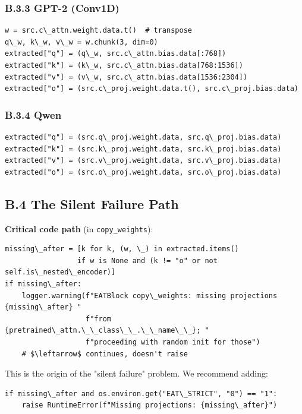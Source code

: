 \subsubsection{B.3.3 GPT-2 (Conv1D)}

\begin{lstlisting}
w = src.c\_attn.weight.data.t()  # transpose
q\_w, k\_w, v\_w = w.chunk(3, dim=0)
extracted["q"] = (q\_w, src.c\_attn.bias.data[:768])
extracted["k"] = (k\_w, src.c\_attn.bias.data[768:1536])
extracted["v"] = (v\_w, src.c\_attn.bias.data[1536:2304])
extracted["o"] = (src.c\_proj.weight.data.t(), src.c\_proj.bias.data)
\end{lstlisting}

\subsubsection{B.3.4 Qwen}

\begin{lstlisting}
extracted["q"] = (src.q\_proj.weight.data, src.q\_proj.bias.data)
extracted["k"] = (src.k\_proj.weight.data, src.k\_proj.bias.data)
extracted["v"] = (src.v\_proj.weight.data, src.v\_proj.bias.data)
extracted["o"] = (src.o\_proj.weight.data, src.o\_proj.bias.data)
\end{lstlisting}

\subsection{B.4 The Silent Failure Path}

\textbf{Critical code path} (in \texttt{copy\_weights}):

\begin{lstlisting}
missing\_after = [k for k, (w, \_) in extracted.items() 
                 if w is None and (k != "o" or not self.is\_nested\_encoder)]
if missing\_after:
    logger.warning(f"EATBlock copy\_weights: missing projections {missing\_after} "
                   f"from {pretrained\_attn.\_\_class\_\_.\_\_name\_\_}; "
                   f"proceeding with random init for those")
    # $\leftarrow$ continues, doesn't raise
\end{lstlisting}

This is the origin of the "silent failure" problem. We recommend adding:

\begin{lstlisting}
if missing\_after and os.environ.get("EAT\_STRICT", "0") == "1":
    raise RuntimeError(f"Missing projections: {missing\_after}")
\end{lstlisting}

